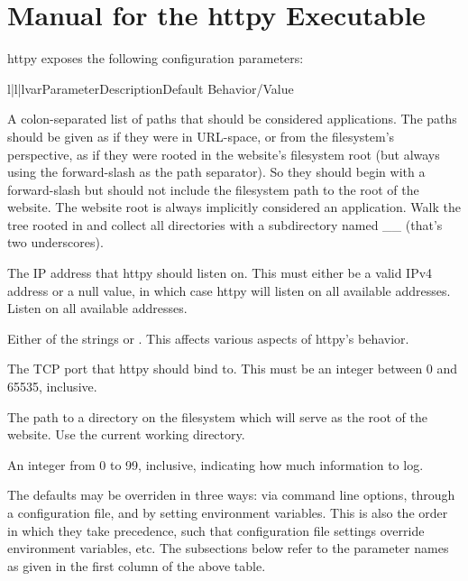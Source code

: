 \chapter{Manual for the httpy Executable \label{manual}}

httpy exposes the following configuration parameters:


\begin{tableiii}{l|l|l}{var}{Parameter}{Description}{Default Behavior/Value}

    {A colon-separated list of paths that should be considered applications. The
    paths should be given as if they were in URL-space, or from the filesystem's
    perspective, as if they were rooted in the website's filesystem root (but
    always using the forward-slash as the path separator). So they should begin
    with a forward-slash but should not include the filesystem path to the root
    of the website. The website root is always implicitly considered an
    application.}
    {Walk the tree rooted in  and collect all directories with a
    subdirectory named __ (that's two underscores).}

    {The IP address that httpy should listen on. This must either be a valid
    IPv4 address or a null value, in which case httpy will listen on all
    available addresses.}
    {Listen on all available addresses.}

    {Either of the strings  or . This affects
    various aspects of httpy's behavior.}
    {}

    {The TCP port that httpy should bind to. This must be an integer between 0
    and 65535, inclusive.}
    {}

    {The path to a directory on the filesystem which will serve as the root of
    the website.}
    {Use the current working directory.}

    {An integer from 0 to 99, inclusive, indicating how much information to
    log.}
    {}

\end{tableiii}

The defaults may be overriden in three ways: via command line options, through a
configuration file, and by setting environment variables. This is also the order
in which they take precedence, such that configuration file settings override
environment variables, etc. The subsections below refer to the parameter names
as given in the first column of the above table.




